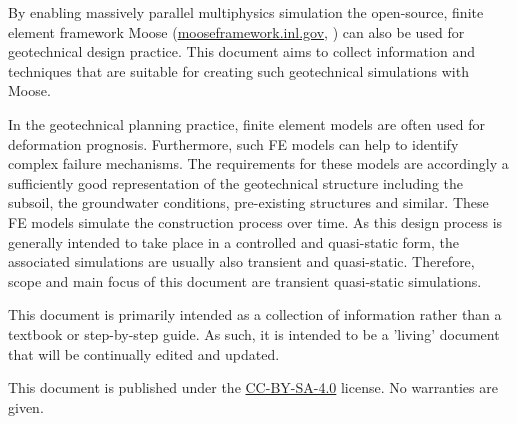 By enabling massively parallel multiphysics simulation the open-source, finite
element framework Moose
(\href{https://mooseframework.inl.gov}{mooseframework.inl.gov},
\cite{PERMANN2020100430}) can also be used for geotechnical design practice.
This document aims to collect information and techniques that are suitable for
creating such geotechnical simulations with Moose.

In the geotechnical planning practice, finite element models are often used for
deformation prognosis. Furthermore, such FE models can help to identify complex
failure mechanisms. The requirements for these models are accordingly a
sufficiently good representation of the geotechnical structure including the
subsoil, the groundwater conditions, pre-existing structures and similar. These
FE models simulate the construction process over time. As this design process
is generally intended to take place in a controlled and quasi-static form, the
associated simulations are usually also transient and quasi-static. Therefore,
scope and main focus of this document are transient quasi-static simulations.

This document is primarily intended as a collection of information rather than
a textbook or step-by-step guide. As such, it is intended to be a 'living'
document that will be continually edited and updated.

This document is published under the
\href{https://creativecommons.org/licenses/by-sa/4.0/}{CC-BY-SA-4.0} license.
No warranties are given.